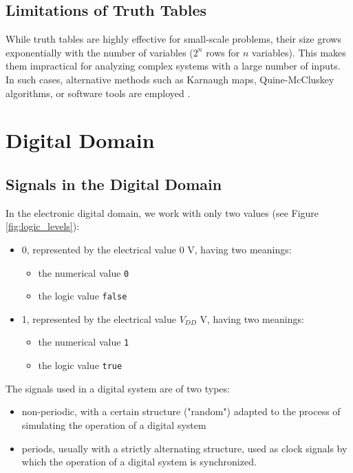 \subsection{Limitations of Truth Tables}
While truth tables are highly effective for small-scale problems, their size grows exponentially with the number of variables (\( 2^n \) rows for \( n \) variables). This makes them impractical for analyzing complex systems with a large number of inputs. In such cases, alternative methods such as Karnaugh maps, Quine-McCluskey algorithms, or software tools are employed \cite{karnaugh1953, rosen2018}.


\section{Digital Domain}
\subsection{Signals in the Digital Domain}
In the electronic digital domain, we work with only two values (see Figure \ref{fig:logic_levels}):


\begin{itemize}
\item 0, represented by the electrical value 0 V, having two meanings:
\begin{itemize}
\item the numerical value {\tt 0}
\item the logic value {\tt false}
\end{itemize}
\item 1, represented by the electrical value $V_{DD}$ V, having two meanings:
\begin{itemize}
\item the numerical value {\tt 1}
\item the logic value {\tt true}
\end{itemize}
\end{itemize}

The signals used in a digital system are of two types:
\begin{itemize}
\item non-periodic, with a certain structure ("random") adapted to the process of simulating the operation of a digital system
\item periods, usually with a strictly alternating structure, used as clock signals by which the operation of a digital system is synchronized.
\end{itemize}

